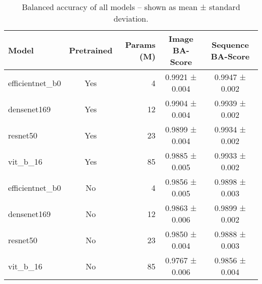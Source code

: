 \begin{table}[H]
\centering
\caption{Balanced accuracy of all models -- shown as mean ± standard deviation.}
\label{tab:bal_acc_by_model}
\begin{tabular}{l c r c c}
\toprule
Model & Pretrained & Params (M) & Image BA-Score & Sequence BA-Score \\
\midrule
efficientnet\_b0 & Yes & 4 & 0.9921 ± 0.004 & 0.9947 ± 0.002 \\
densenet169 & Yes & 12 & 0.9904 ± 0.004 & 0.9939 ± 0.002 \\
resnet50 & Yes & 23 & 0.9899 ± 0.004 & 0.9934 ± 0.002 \\
vit\_b\_16 & Yes & 85 & 0.9885 ± 0.005 & 0.9933 ± 0.002 \\
\midrule
efficientnet\_b0 & No & 4 & 0.9856 ± 0.005 & 0.9898 ± 0.003 \\
densenet169 & No & 12 & 0.9863 ± 0.006 & 0.9899 ± 0.002 \\
resnet50 & No & 23 & 0.9850 ± 0.004 & 0.9888 ± 0.003 \\
vit\_b\_16 & No & 85 & 0.9767 ± 0.006 & 0.9856 ± 0.004 \\
\bottomrule
\end{tabular}
\end{table}